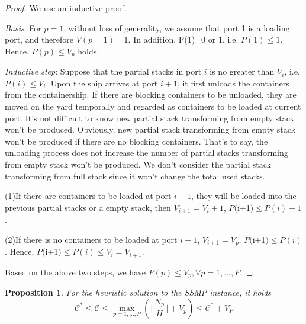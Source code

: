 \documentclass[review,3p,times,authoryear,12pt]{elsarticle}
\newtheorem{proposition}{Proposition}
\begin{document}
\begin{proof}

We use an inductive proof.

\textit{Basis}: For $p=1$, without loss of generality, we assume that port 1 is a loading port, and therefore $V(p=1)$ =1.
In addition, P(1)=0 or 1, i.e. $P(1) \le 1$. Hence, $P(p) \le V_p $ holds.

\textit{Inductive step}: Suppose that the partial stacks in port $i$ is no greater than $V_i$, i.e. $P(i) \le V_i $.
Upon the ship arrives at port $i+1$, it first unloads the containers from the containership.
If there are blocking containers to be unloaded, they are moved on the yard temporally and regarded as containers to be loaded at current port.
It's not difficult to know new partial stack transforming from empty stack won't be produced.
Obviously, new partial stack transforming from empty stack won't be produced if there are no blocking containers.
That's to say, the unloading process does not increase the number of partial stacks transforming from empty stack won't be produced.
We don't consider the partial stack transforming from full stack since it won't change the total used stacks.

(1)If there are containers to be loaded at port $i+1$, they will be loaded into the previous partial stacks or a empty stack, then $V_{i+1}=V_i+1$,  $P($i+1$) \le P(i)+1$.

(2)If there is no containers to be loaded at port $i+1$,  $V_{i+1}=V_p$, $P($i+1$) \le P(i)$. Hence, $P($i+1$) \le P(i) \le V_{i}=V_{i+1}$.

Based on the above two steps, we have $P(p) \le V_p,  \forall p=1,\ldots,P$.
\end{proof}


\begin{proposition}
For the heuristic solution to the SSMP instance, it holds
\begin{equation*}
\mathcal{C}^* \le \mathcal{C} \le \max_{p=1,\ldots,P}(\lfloor\frac{N_p}{H}\rfloor+V_p) \le \mathcal{C}^*+V_P
\end{equation*}
\label{pro:a3}
\end{proposition}
\end{document}
